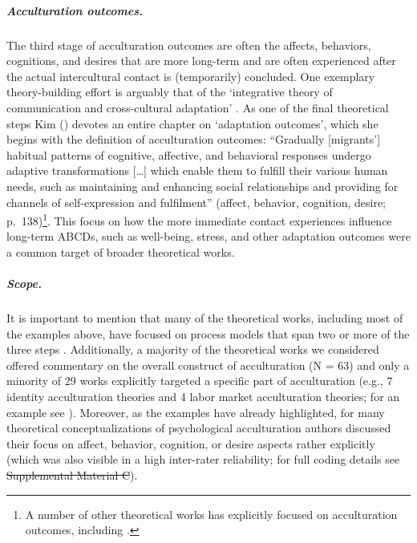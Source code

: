 \documentclass[man, 12pt, a4paper, mask]{apa7}
\newcommand{\siannotatedanalyses}{Supplemental Material B} %
\providecommand{\DIFaddtex}[1]{{\protect\color{blue}\uwave{#1}}} %
\providecommand{\DIFdeltex}[1]{{\protect\color{red}\sout{#1}}}                      %
\providecommand{\DIFaddbegin}{} %
\providecommand{\DIFaddend}{} %
\providecommand{\DIFdelbegin}{} %
\providecommand{\DIFdelend}{} %
\providecommand{\DIFadd}[1]{\texorpdfstring{\DIFaddtex{#1}}{#1}} %
\providecommand{\DIFdel}[1]{\texorpdfstring{\DIFdeltex{#1}}{}} %
\newcommand{\DIFscaledelfig}{0.5}
\newlength{\DIFdelgraphicswidth} %
\newlength{\DIFdelgraphicsheight} %
\newcommand{\DIFaddincludegraphics}[2][]{{\color{blue}\fbox{\DIFOincludegraphics[#1]{#2}}}} %
\newcommand{\DIFdelincludegraphics}[2][]{%
\sbox{\DIFdelgraphicsbox}{\DIFOincludegraphics[#1]{#2}}%
\settoboxwidth{\DIFdelgraphicswidth}{\DIFdelgraphicsbox} %
\settoboxtotalheight{\DIFdelgraphicsheight}{\DIFdelgraphicsbox} %
\scalebox{\DIFscaledelfig}{%
\parbox[b]{\DIFdelgraphicswidth}{\usebox{\DIFdelgraphicsbox}\\[-\baselineskip] \rule{\DIFdelgraphicswidth}{0em}}\llap{\resizebox{\DIFdelgraphicswidth}{\DIFdelgraphicsheight}{%
\setlength{\unitlength}{\DIFdelgraphicswidth}%
\begin{picture}(1,1)%
\thicklines\linethickness{2pt} %
{\color[rgb]{1,0,0}\put(0,0){\framebox(1,1){}}}%
{\color[rgb]{1,0,0}\put(0,0){\line( 1,1){1}}}%
{\color[rgb]{1,0,0}\put(0,1){\line(1,-1){1}}}%
\end{picture}%
}\hspace*{3pt}}} %
} %
\DeclareRobustCommand{\DIFaddbegin}{\DIFOaddbegin \let\includegraphics\DIFaddincludegraphics} %
\DeclareRobustCommand{\DIFaddend}{\DIFOaddend \let\includegraphics\DIFOincludegraphics} %
\DeclareRobustCommand{\DIFdelbegin}{\DIFOdelbegin \let\includegraphics\DIFdelincludegraphics} %
\DeclareRobustCommand{\DIFdelend}{\DIFOaddend \let\includegraphics\DIFOincludegraphics} %
\begin{document}
\subparagraph{Acculturation outcomes.}

The third stage of acculturation outcomes are often the affects,
behaviors, cognitions, and desires that are more long-term and are often
experienced after the actual intercultural contact is (temporarily)
concluded. One exemplary theory-building effort is arguably that of the
`integrative theory of communication and cross-cultural adaptation'
\citep[][]{Kim1988}. As one of the final theoretical steps Kim
(\citeyear[][]{Kim1988}) devotes an entire chapter on `adaptation
outcomes', which she begins with the definition of acculturation
outcomes: ``Gradually {[}migrants'{]} habitual patterns of cognitive,
affective, and behavioral responses undergo adaptive transformations
{[}\ldots{]} which enable them to fulfill their various human needs,
such as maintaining and enhancing social relationships and providing for
channels of self-expression and fulfilment'' (affect, behavior,
cognition, desire;
p.~138)\footnote{A number of other theoretical works has explicitly focused on acculturation outcomes, including \citet[][]{Baird2015, Berry1998, Berry1992, Berry2005, Riedel2011, Rogler1994, Luedicke2011}.}.
This focus on how the more immediate contact experiences influence
long-term ABCDs, such as well-being, stress, and other adaptation
outcomes were a common target of broader theoretical works.

\subparagraph{Scope.}

It is important to mention that many of the theoretical works, including
most of the examples above, have focused on process models that span two
or more of the three steps
\citep[e.g.,][]{Berry1992, Ward2016, Arends-Toth2006a, Rogler1994}.
Additionally, a majority of the theoretical works we considered offered
commentary on the overall construct of acculturation (N = 63) and only a
minority of 29 works explicitly targeted a specific part of
acculturation (e.g., 7 identity acculturation theories and 4 labor
market acculturation theories; for an example see
\citealp{Weinreich2009}). Moreover, as the examples have already
highlighted, for many theoretical conceptualizations of psychological
acculturation authors discussed their focus on affect, behavior,
cognition, or desire aspects rather explicitly (which was also visible
in a high inter-rater reliability; for full coding details see
\DIFdelbegin \DIFdel{Supplemental Material C}\DIFdelend \DIFaddbegin \DIFadd{\siannotatedanalyses}\DIFaddend ).
\end{document}
